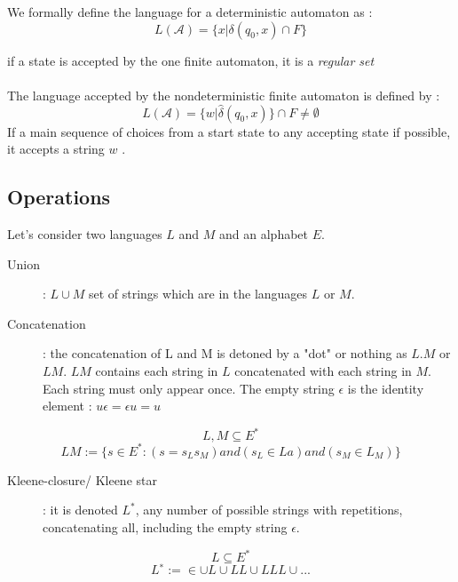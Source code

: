 We formally define the language for a deterministic automaton as :\\
\begin{equation*}
L(\mathcal{A}) = \{x|\delta(q_0,x) \cap F\}
\end{equation*}

if a state is accepted by the one finite automaton, it is a \textit{regular set} \\
\\
The language accepted by the nondeterministic finite automaton is defined by : 
\begin{equation*}
L(\mathcal{A}) = \{w|\widehat{\delta}(q_0,x)\} \cap F \neq \emptyset
\end{equation*}
If a main sequence of choices from a start state to any accepting state if possible, it accepts a string $w$ .

\subsection{Operations} 

Let's consider two languages $L$ and $M$ and an alphabet $E$.\\
\begin{description}
\item [Union] : $L \cup M$ set of strings which are in the languages $L$ or $M$.
\item [Concatenation] : the concatenation of L and M is detoned by a "dot" or nothing as $L.M$ or $LM$. $LM$ contains each string in $L$ concatenated with each string in $M$. Each string must only appear once. The empty string $\epsilon$ is the identity element : $u \epsilon = \epsilon u = u$
\end{description}
\begin{equation*}
L,M \subseteq E^*
\end{equation*}
\begin{equation*}
LM := \{s \in E^*: (s = s_Ls_M) and (s_L ∈ La) and (s_M \in L_M)\}
\end{equation*}

\begin{description}
\item [Kleene-closure/ Kleene star] : it is denoted $L^*$, any number of possible strings  with repetitions, concatenating all, including the empty string $\epsilon$.
\end{description}
\begin{equation*}
L \subseteq E^*
\end{equation*}
\begin{equation*}
L^∗ := {\in} \cup L \cup LL \cup LLL \cup ...
\end{equation*}

